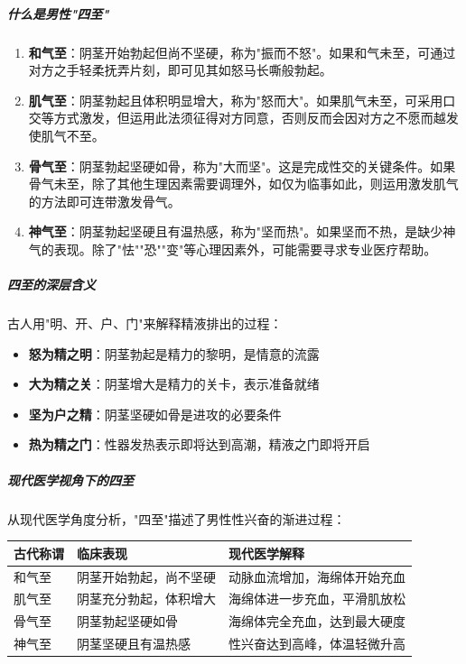 \subparagraph{什么是男性"四至"}

\begin{enumerate}
    \item \textbf{和气至}：阴茎开始勃起但尚不坚硬，称为"振而不怒"。如果和气未至，可通过对方之手轻柔抚弄片刻，即可见其如怒马长嘶般勃起。

    \item \textbf{肌气至}：阴茎勃起且体积明显增大，称为"怒而大"。如果肌气未至，可采用口交等方式激发，但运用此法须征得对方同意，否则反而会因对方之不愿而越发使肌气不至。

    \item \textbf{骨气至}：阴茎勃起坚硬如骨，称为"大而坚"。这是完成性交的关键条件。如果骨气未至，除了其他生理因素需要调理外，如仅为临事如此，则运用激发肌气的方法即可连带激发骨气。

    \item \textbf{神气至}：阴茎勃起坚硬且有温热感，称为"坚而热"。如果坚而不热，是缺少神气的表现。除了"怯""恐""变"等心理因素外，可能需要寻求专业医疗帮助。
\end{enumerate}

\subparagraph{四至的深层含义}

古人用"明、开、户、门"来解释精液排出的过程：
\begin{itemize}
    \item \textbf{怒为精之明}：阴茎勃起是精力的黎明，是情意的流露
    \item \textbf{大为精之关}：阴茎增大是精力的关卡，表示准备就绪
    \item \textbf{坚为户之精}：阴茎坚硬如骨是进攻的必要条件
    \item \textbf{热为精之门}：性器发热表示即将达到高潮，精液之门即将开启
\end{itemize}

\subparagraph{现代医学视角下的四至}

从现代医学角度分析，"四至"描述了男性性兴奋的渐进过程：

\begin{center}
\begin{tabular}{p{3cm} p{5cm} p{4cm}}
\toprule
\textbf{古代称谓} & \textbf{临床表现} & \textbf{现代医学解释} \\
\midrule
和气至 & 阴茎开始勃起，尚不坚硬 & 动脉血流增加，海绵体开始充血 \\
肌气至 & 阴茎充分勃起，体积增大 & 海绵体进一步充血，平滑肌放松 \\
骨气至 & 阴茎勃起坚硬如骨 & 海绵体完全充血，达到最大硬度 \\
神气至 & 阴茎坚硬且有温热感 & 性兴奋达到高峰，体温轻微升高 \\
\bottomrule
\end{tabular}
\end{center}


